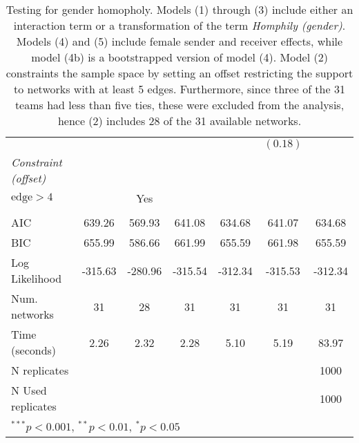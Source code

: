 \begin{table}[tb]
\begin{tabular}{l c c c c c c }
                                          &               &               &               &               & $(0.18)$      &               \\
\textit{Constraint (offset)} \\
\hspace{5mm}$\text{edge} > 4$        &               & Yes        &               &               &               &               \\
                                          &               & $$            &               &               &               &               \\
\midrule
AIC                                       & 639.26        & 569.93        & 641.08        & 634.68        & 641.07        & 634.68        \\
BIC                                       & 655.99        & 586.66        & 661.99        & 655.59        & 661.98        & 655.59        \\
Log Likelihood                            & -315.63       & -280.96       & -315.54       & -312.34       & -315.53       & -312.34       \\
Num. networks                             & 31            & 28            & 31            & 31            & 31            & 31            \\
Time (seconds)                            & 2.26          & 2.32          & 2.28          & 5.10          & 5.19          & 83.97         \\
N replicates                              &               &               &               &               &               & 1000          \\
N Used replicates                         &               &               &               &               &               & 1000          \\
\bottomrule
\multicolumn{7}{l}{\scriptsize{$^{***}p<0.001$, $^{**}p<0.01$, $^*p<0.05$}}
\end{tabular}
\caption{Testing for gender homopholy. Models (1) through (3) include either an interaction term or a transformation of the term \textit{Homphily (gender)}. Models (4) and (5) include female sender and receiver effects, while model (4b) is a bootstrapped version of model (4). Model (2) constraints the sample space by setting an offset restricting the support to networks with at least 5 edges. Furthermore, since three of the 31 teams had less than five ties, these were excluded from the analysis, hence (2) includes 28 of the 31 available networks.}
\label{tab:ci-ergm-full}
\end{table}